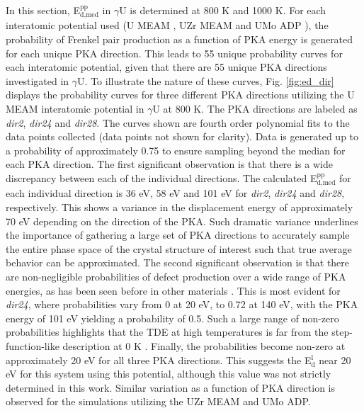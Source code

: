 \documentclass[review]{elsarticle}
\begin{document}
In this section, E$^{\textrm{pp}}_{\textrm{d,med}}$ in $\gamma$U is determined at 800 K and 1000 K. For each interatomic potential used (U MEAM \cite{beeler_meam}, UZr MEAM \cite{moore2015} and UMo ADP \cite{smirnovaADP}), the probability of Frenkel pair production as a function of PKA energy is generated for each unique PKA direction. This leads to 55 unique probability curves for each interatomic potential, given that there are 55 unique PKA directions investigated in $\gamma$U. To illustrate the nature of these curves, Fig. \ref{fig:ed_dir} displays the probability curves for three different PKA directions utilizing the U MEAM interatomic potential in $\gamma$U at 800 K. The PKA directions are labeled as \textit{dir2}, \textit{dir24} and \textit{dir28}. The curves shown are fourth order polynomial fits to the data points collected (data points not shown for clarity). Data is generated up to a probability of approximately 0.75 to ensure sampling beyond the median for each PKA direction. The first significant observation is that there is a wide discrepancy between each of the individual directions. The calculated E$^{\textrm{pp}}_{\textrm{d,med}}$ for each individual direction is 36 eV, 58 eV and 101 eV for \textit{dir2}, \textit{dir24} and \textit{dir28}, respectively. This shows a variance in the displacement energy of approximately 70 eV depending on the direction of the PKA. Such dramatic variance underlines the importance of gathering a large set of PKA directions to accurately sample the entire phase space of the crystal structure of interest such that true average behavior can be approximated. The second significant observation is that there are non-negligible probabilities of defect production over a wide range of PKA energies, as has been seen before in other materials \cite{beeler2016, nordlund2006, zepeda-ruiz2003, tsuchihira2013}. This is most evident for \textit{dir24}, where probabilities vary from 0 at 20 eV, to 0.72 at 140 eV, with the PKA energy of 101 eV yielding a probability of 0.5. Such a large range of non-zero probabilities highlights that the TDE at high temperatures is far from the step-function-like description at 0 K \cite{was2007}. Finally, the probabilities become non-zero at approximately 20 eV for all three PKA directions. This suggests the E$^{\textrm{l}}_{\textrm{d}}$ near 20 eV for this system using this potential, although this value was not strictly determined in this work. Similar variation as a function of PKA direction is observed for the simulations utilizing the UZr MEAM and UMo ADP.
 
\end{document}
